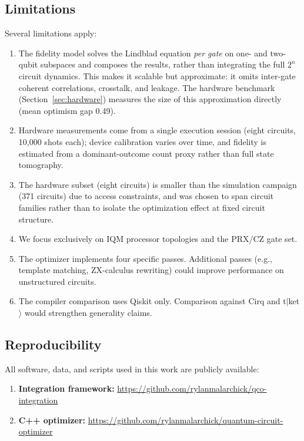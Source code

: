 \documentclass[sigconf,nonacm]{acmart}
\begin{document}
\subsection{Limitations}

Several limitations apply:

\begin{enumerate}
    \item The fidelity model solves the Lindblad equation \emph{per gate} on one- and two-qubit subspaces and composes the results, rather than integrating the full $2^n$ circuit dynamics. This makes it scalable but approximate: it omits inter-gate coherent correlations, crosstalk, and leakage. The hardware benchmark (Section~\ref{sec:hardware}) measures the size of this approximation directly (mean optimism gap 0.49).
    \item Hardware measurements come from a single execution session (eight circuits, 10{,}000 shots each); device calibration varies over time, and fidelity is estimated from a dominant-outcome count proxy rather than full state tomography.
    \item The hardware subset (eight circuits) is smaller than the simulation campaign (371 circuits) due to access constraints, and was chosen to span circuit families rather than to isolate the optimization effect at fixed circuit structure.    \item We focus exclusively on IQM processor topologies and the PRX/CZ gate set.
    \item The optimizer implements four specific passes. Additional passes (e.g., template matching, ZX-calculus rewriting) could improve performance on unstructured circuits.
    \item The compiler comparison uses Qiskit only. Comparison against Cirq and t$|$ket$\rangle$ would strengthen generality claims.
\end{enumerate}

\subsection{Reproducibility}
\label{sec:reproducibility}

All software, data, and scripts used in this work are publicly available:
\begin{enumerate}
    \item \textbf{Integration framework:} \url{https://github.com/rylanmalarchick/qco-integration}
    \item \textbf{C++ optimizer:} \url{https://github.com/rylanmalarchick/quantum-circuit-optimizer}
\end{enumerate}
\end{document}
